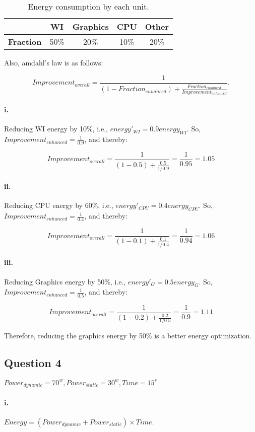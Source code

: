 \documentclass[11pt]{article}
\newcommand{\q}[1]{\subsection*{Question {#1}}}
\renewcommand{\part}[1]{\paragraph*{{#1}.}}
\begin{document}
\begin{table}[h]
\center
\begin{tabular}{|c|c|c|c|c|}
	\hline
	 & \textbf{WI} & \textbf{Graphics} & \textbf{CPU} & \textbf{Other} \\
	\hline
	\textbf{Fraction} & 50\% & 20\% & 10\% & 20\% \\
	\hline
\end{tabular}
\caption{Energy consumption by each unit.}
\label{tbl:amdahl}
\end{table}

Also, amdahl's law is as follows:

\[
Improvement_{overall} = \frac{1}{(1-Fraction_{enhanced}) + \frac{Fraction_{enhanced}}{Improvement_{enhanced}}}.
\]
\part{i} Reducing WI energy by 10\%, i.e., $energy'_{WI} = 0.9 energy_{WI}$. 
So, $Improvement_{enhanced} = \frac{1}{0.9}$, and thereby:

\[
Improvement_{overall} = \frac{1}{(1-0.5) + \frac{0.5}{1/0.9}} = 
\frac{1}{0.95} = 1.05
\]

\part{ii} Reducing CPU energy by 60\%, i.e., $energy'_{CPU} = 0.4 energy_{CPU}$. 
So, $Improvement_{enhanced} = \frac{1}{0.4}$, and thereby:

\[
Improvement_{overall} = \frac{1}{(1-0.1) + \frac{0.1}{1/0.4}} = 
\frac{1}{0.94} = 1.06
\]

\part{iii} Reducing Graphics energy by 50\%, i.e., $energy'_{G} = 0.5 energy_{G}$. 
So, $Improvement_{enhanced} = \frac{1}{0.5}$, and thereby:

\[
Improvement_{overall} = \frac{1}{(1-0.2) + \frac{0.2}{1/0.5}} = 
\frac{1}{0.9} = 1.11
\]

Therefore, reducing the graphics energy by 50\% is a better energy optimization.

\q{4} $Power_{dynamic} = 70^w,  Power_{static} = 30^w,  Time = 15^s$

\part{i} $Energy = (Power_{dynamic} + Power_{static}) \times Time$.
\end{document}
